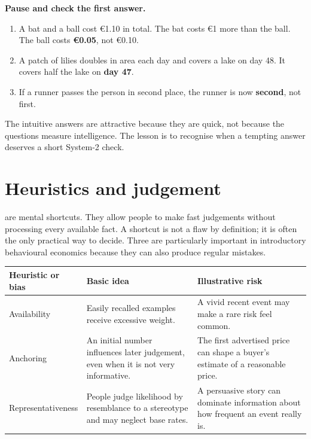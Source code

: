 \begin{exercisebox}
\textbf{Pause and check the first answer.}
\begin{enumerate}[label=(\alph*)]
  \item A bat and a ball cost \euro1.10 in total. The bat costs \euro1 more
  than the ball. The ball costs \textbf{\euro0.05}, not \euro0.10.
  \item A patch of lilies doubles in area each day and covers a lake on day
  48. It covers half the lake on \textbf{day 47}.
  \item If a runner passes the person in second place, the runner is now
  \textbf{second}, not first.
\end{enumerate}
The intuitive answers are attractive because they are quick, not because the
questions measure intelligence. The lesson is to recognise when a tempting
answer deserves a short System-2 check.
\end{exercisebox}

\section{Heuristics and judgement}

 are mental shortcuts. They allow people to make fast
judgements without processing every available fact. A shortcut is not a flaw
by definition; it is often the only practical way to decide. Three are
particularly important in introductory behavioural economics because they can
also produce regular mistakes.

\begin{center}
\small
\renewcommand{\arraystretch}{1.18}
\begin{tabular}{@{}p{2.75cm}p{3.35cm}p{4.50cm}@{}}
  \toprule
  Heuristic or bias & Basic idea & Illustrative risk\\
  \midrule
  Availability & Easily recalled examples receive excessive weight. & A vivid recent event may make a rare risk feel common.\\
  Anchoring & An initial number influences later judgement, even when it is not very informative. & The first advertised price can shape a buyer's estimate of a reasonable price.\\
  Representativeness & People judge likelihood by resemblance to a stereotype and may neglect base rates. & A persuasive story can dominate information about how frequent an event really is.\\
  \bottomrule
\end{tabular}
\end{center}


